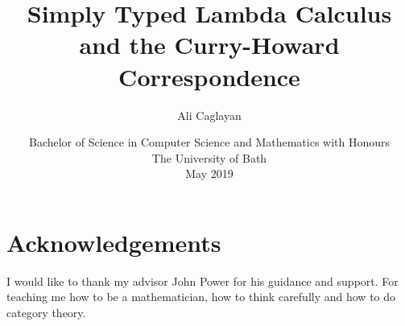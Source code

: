 \documentclass{article}
\title{Simply Typed Lambda Calculus and the Curry-Howard Correspondence}
\author{Ali Caglayan}
\date{Bachelor of Science in Computer Science and Mathematics with Honours\\The University of Bath\\May 2019}
\theoremstyle{definition}
\begin{document}
%
\setcounter{page}{0}


\maketitle
\newpage


\newpage

\newpage

\begin{abstract}
    
\end{abstract}
\newpage

\tableofcontents
\newpage

\section*{Acknowledgements}
I would like to thank my advisor John Power for his guidance and support. For teaching me how to be a mathematician, how to think carefully and how to do category theory.

\newpage

\setcounter{page}{1}

















\newpage
 

\end{document}
